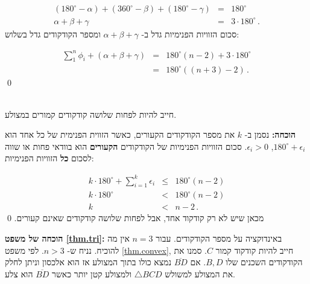 \begin{eqnarray*}
(180^\circ - \alpha) + (360^\circ - \beta) + (180^\circ - \gamma) &=& 180^\circ\\
\alpha + \beta + \gamma &=& 3\cdot 180^\circ\,.
\end{eqnarray*}
סכום הזוויות הפנימיות גדל ב-%
$\alpha+\beta+\gamma$
ומספר הקודקודים גדל בשלוש:

\begin{eqnarray*}
\displaystyle\sum_1^n \phi_i + (\alpha + \beta + \gamma) &=& 180^\circ(n-2)+3\cdot 180^\circ\\
&=& 180^\circ((n+3)-2)\,.
\end{eqnarray*}
\qed



\begin{theorem}\label{thm.convex}\mbox{}\\
חייב להיות לפחות שלושה קודקודים קמורים במצולע.
\end{theorem}



\textbf{הוכחה:}
נסמן ב-%
$k$
את מספר הקודקודים הקעורים, כאשר הזווית הפנימית של כל אחד הוא
$180^\circ+\epsilon_i$, $\epsilon_i>0$.
סכום הזוויות הפנימיות של הקודקודים
\textbf{הקעורים}
הוא בוודאי פחות או שווה לסכום
\textbf{כל}
הזוויות הפנימיות:

\begin{eqnarray*}
k\cdot 180^\circ +\displaystyle\sum_{i=1}^{k}\epsilon_i &\leq& 180^\circ(n-2)\\
k\cdot 180^\circ  &<& 180^\circ(n-2)\\
k&<&n-2\,.
\end{eqnarray*}
מכאן שיש לא רק קודקוד אחד, אבל לפחות שלושה קודקודים שאינם קעורים.
\qed

\textbf{הוכחה של משפט
\ref{thm.tri}:}
באינדוקציה על מספר הקודקודים. עבור
$n=3$
אין מה להוכיח. נניח ש-%
$n>3$.
לפי משפט 
\ref{thm.convex},
חייב להיות קודקוד קמור
$C$.
סמנו את הקודקודים השכנים שלו
$B,D$.
אם
$\overline{BD}$
נמצא כולו בתוך המצולע אז הוא אלכסון וניתן לחלק את המצולע למשולש 
$\triangle BCD$
ולמצולע קטן יותר כאשר
$\overline{BD}$
הוא צלע.

\begin{center}

\end{center}


